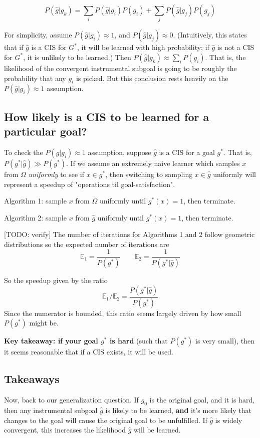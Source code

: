 \documentclass{article}
\begin{document}
\[
P(\hat{g}|g_k)=\sum_i P(\hat{g}|g_i)P(g_i) + \sum_j P(\hat{g}|g_j)P(g_j)
\]

For simplicity, assume $P(\hat{g}|g_i) \approx 1$, and $P(\hat{g}|g_j) \approx 0$. (Intuitively, this states that if $\hat{g}$ is a CIS for $G^*$, it will be learned with high probability; if $\hat{g}$ is not a CIS for $G^*$, it is unlikely to be learned.) Then $P(\hat{g}|g_k) \approx \sum_i P(g_i)$. That is, the likelihood of the convergent instrumental subgoal is going to be roughly the probability that any $g_i$ is picked. But this conclusion rests heavily on the $P(\hat{g}|g_i) \approx 1$ assumption.

\subsection{How likely is a CIS to be learned for a particular goal?}
To check the $P(\hat{g}|g_i) \approx 1$ assumption, suppose $\hat{g}$ is a CIS for a goal $g^*$. That is, $P(g^*|\hat{g})\gg P(g^*)$. If we assume an extremely naive learner which samples $x$ from $\Omega$ \textit{uniformly} to see if $x \in g^*$, then switching to sampling $x \in \hat{g}$ uniformly will represent a speedup of "operations til goal-satisfaction".

Algorithm 1: sample $x$ from $\Omega$ uniformly until $g^*(x)=1$, then terminate.

Algorithm 2: sample $x$ from $\hat{g}$ uniformly until $g^*(x)=1$, then terminate.

[TODO: verify] The number of iterations for Algorithms 1 and 2 follow geometric distributions so the expected number of iterations are 
\[
\mathbb{E}_1 = \frac{1}{P(g^*)} \qquad \mathbb{E}_2 = \frac{1}{P(g^*|\hat{g})}    
\]

So the speedup given by the ratio
\[
\mathbb{E}_1 / \mathbb{E}_2 = \frac{P(g^*|\hat{g})}{P(g^*)}
\]
Since the numerator is bounded, this ratio seems largely driven by how small $P(g^*)$ might be.

\textbf{Key takeaway: if your goal $g^*$ is hard} (such that $P(g^*)$ is very small), then it seems reasonable that if a CIS exists, it will be used.

\subsection{Takeaways}
Now, back to our generalization question. If $g_0$ is the original goal, and it is hard, then any instrumental subgoal $\hat{g}$ is likely to be learned, \textbf{and} it's more likely that changes to the goal will cause the original goal to be unfulfilled. If $\hat{g}$ is widely convergent, this increases the likelihood $\hat{g}$ will be learned.
\end{document}
